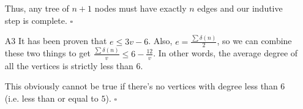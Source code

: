 \documentclass[12pt]{article}
\begin{document}
\begin{itemize}
            Thus, any tree of $n+1$ nodes must have exactly $n$ edges
            and our indutive step is complete. $\square$
      \item[A3] It has been proven that $e \le 3v-6$.
            Also, $e=\frac{\sum \delta(n)}{2}$, so we can combine these two
            things to get $\frac{\sum \delta(n)}{v} \le 6-\frac{12}{v}$.
            In other words, the average degree of all the vertices
            is strictly less than $6$.

            This obviously cannot be true if there's no vertices
            with degree less than $6$ (i.e. less than or equal to $5$). $\square$
\end{itemize}
\end{document}
